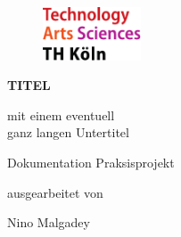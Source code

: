 \begin{titlepage}

\begin{center}

\begin{figure}[!ht]
		\includegraphics[width=0.26\textwidth]{images/THlogoheader.pdf}
\end{figure}

\vspace{0.4cm}

\begin{rmfamily}
\begin{huge}
\textbf{TITEL}\\	
\end{huge}
\begin{LARGE}
	mit einem eventuell\\ganz langen Untertitel\\
\end{LARGE}
\vspace{0.5cm}
\end{rmfamily}

\vspace{0.8cm}



\begin{LARGE}
\begin{scshape}
Dokumentation Praksisprojekt\\[0.8em]
\end{scshape}
\end{LARGE}

\begin{large}
ausgearbeitet von\\ 
\vspace{0.3cm}
\begin{LARGE}
Nino Malgadey\\
\end{LARGE}
\end{large}


\end{center}
\end{titlepage}
